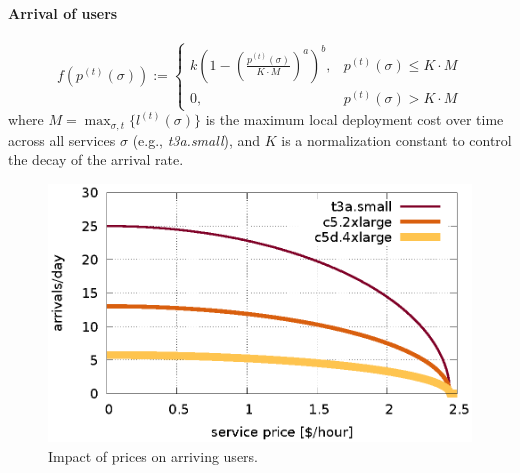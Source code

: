 \documentclass[aspectratio=169]{beamer}
\begin{document}
\begin{frame}
    \frametitle{\secname}
    \framesubtitle{Arrival of users~\cite{xavierPricing}}

    \begin{minipage}{.6\textwidth}
        \begin{equation}
            f(p^{(t)}(\sigma)) \!:=\! \begin{cases}
                k\left( 1 - \left( \frac{p^{(t)}(\sigma)}{K\cdot M}\right)^a \right)^b\!\!\!, & p^{(t)}(\sigma) \le K\cdot M\\
                0, & p^{(t)}(\sigma) > K\cdot M
            \end{cases}
            \label{eq:arrival}
        \end{equation}
        where $M=\max_{\sigma,t} \{l^{(t)}(\sigma)\}$ is the maximum local deployment cost over time across all services $\sigma$ (e.g., \textit{t3a.small}), and $K$ is a normalization constant to control the decay of the arrival rate.
    \end{minipage}
    \hfill
    \begin{minipage}{.26\textwidth}
        \begin{figure}
            \centering
            \includegraphics[width=\textwidth]{img/rho-arrivals}
            \caption{Impact of prices on arriving users.}
            \label{fig:arrivals}
        \end{figure}
    \end{minipage}
\end{frame}
\end{document}
